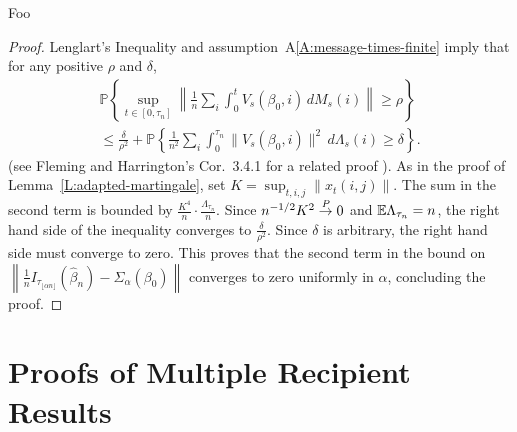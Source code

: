 \documentclass[aoas,preprint]{imsart}
\begin{document}
\begin{lemma}\label{L:Lenglart}
Foo
\end{lemma}

\begin{proof}
Lenglart's Inequality and assumption~A\ref{A:message-times-finite} imply that for
any positive $\rho$ and $\delta$,
\begin{multline*}
    \mathbb{P}\left\{
        \sup_{t \in [0,\tau_n]}
        \left\|
            \frac{1}{n}
            \sum_{i}
            \int_{0}^{t}
                V_s(\beta_0, i) \, dM_s(i)
        \right\|
        \geq \rho
    \right\} \\
    \leq
    \frac{\delta}{\rho^2}
    +
    \mathbb{P}\left\{
        \frac{1}{n^2}
        \sum_{i}
        \int_{0}^{\tau_n}
            \| V_s (\beta_0, i) \|^2
            \, d\Lambda_s(i)
        \geq
        \delta
    \right\}.
\end{multline*}
(see Fleming and Harrington's Cor.~3.4.1 for a related proof
\cite{fleming1991counting}).    As in the proof of
Lemma~\ref{L:adapted-martingale}, set $K = \sup_{t,i,j} \| x_t(i,j) \|$.
The sum in the second term is bounded by
$\frac{K^4}{n} \cdot \frac{\Lambda_{\tau_n}}{n}$.  Since $n^{-1/2} K^2 \overset{\mathit{P}}{\to} 0$
and $\mathbb{E} \Lambda_{\tau_n} = n$, the right hand side of the inequality converges
to $\frac{\delta}{\rho^2}$.  Since $\delta$ is arbitrary, the right hand side
must converge to zero.  This proves that the second term in the bound on
\(
    \left\|
        \tfrac{1}{n} I_{\tau_{\lfloor \alpha n \rfloor}}(\hat \beta_n)
        -
        \Sigma_{\alpha} (\beta_0)
    \right\|
\)
converges to zero uniformly in $\alpha$, concluding the proof.
\end{proof}

\section{Proofs of Multiple Recipient Results}\label{S:multiple-recipient-proofs}
\end{document}
